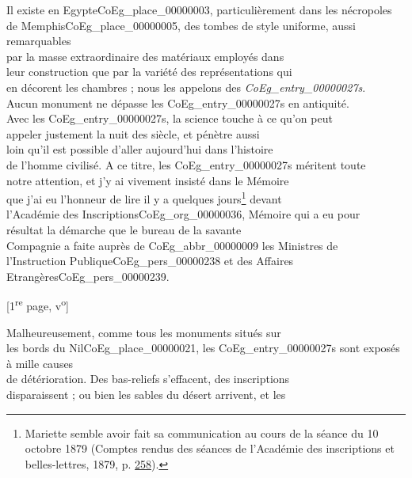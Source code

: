 \documentclass{book}
\begin{document}
{\indent Il existe en Egypte\gls{CoEg_place_00000003}, particulièrement dans les nécropoles\\
de Memphis\gls{CoEg_place_00000005}, des tombes de style uniforme, aussi remarquables\\
par la masse extraordinaire des matériaux employés dans\\
leur construction que par la variété des représentations qui\\
en décorent les chambres ; nous les appelons des \textit{\glspl{CoEg_entry_00000027}}.\\
Aucun monument ne dépasse les \glspl{CoEg_entry_00000027} en antiquité.\\
Avec les \glspl{CoEg_entry_00000027}, la science touche à ce qu’on peut\\
appeler justement la nuit des siècle, et pénètre aussi\\
loin qu’il est possible d’aller aujourd’hui dans l’histoire\\
de l’homme civilisé. A ce titre, les \glspl{CoEg_entry_00000027} méritent toute\\
notre attention, et j’y ai vivement insisté dans le Mémoire\\
que j’ai eu l’honneur de lire il y a quelques jours\footnote{Mariette semble avoir fait sa communication au cours de la séance du 10 octobre 1879 (Comptes rendus des séances de l’Académie des inscriptions et belles-lettres, 1879, p. \href{https://www.persee.fr/doc/crai_0065-0536_1879_num_23_4_88961}{258}).} devant\\
l’Académie des Inscriptions\gls{CoEg_org_00000036}, Mémoire qui a eu pour\\
résultat la démarche que le bureau de la savante\\
Compagnie a faite auprès de \gls{CoEg_abbr_00000009} les Ministres de\\
l’Instruction Publique\gls{CoEg_pers_00000238} et des Affaires Etrangères\gls{CoEg_pers_00000239}.
{\footnotesize \begin{center} [1\textsuperscript{re} page, v\textsuperscript{o}]\end{center}}
Malheureusement, comme tous les monuments situés sur\\
les bords du Nil\gls{CoEg_place_00000021}, les \glspl{CoEg_entry_00000027} sont exposés à mille causes\\
de détérioration. Des bas-reliefs s’effacent, des inscriptions\\
disparaissent ; ou bien les sables du désert arrivent, et les\\
}
\end{document}

